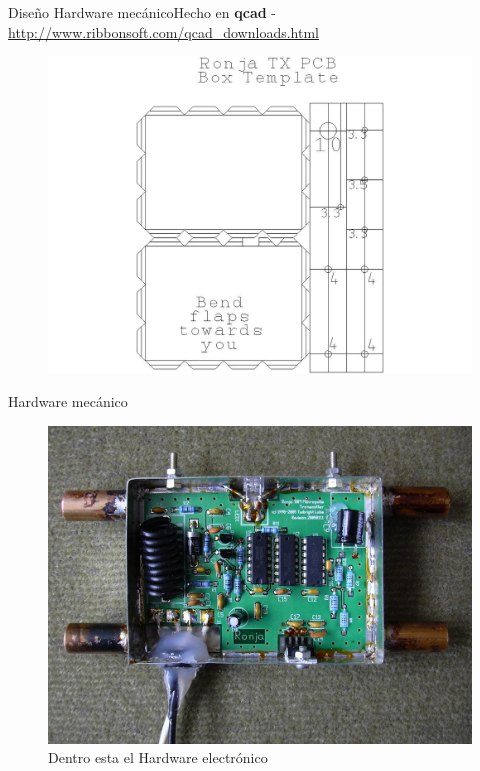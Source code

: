 \documentclass{beamer}
\begin{document}
\begin{frame}{Diseño Hardware mecánico}{Hecho en \textbf{qcad} - \url{http://www.ribbonsoft.com/qcad_downloads.html}}
  \begin{figure}
    \includegraphics[scale=0.225]{transmisor/tx_pcb2}
  \end{figure}
\end{frame}

\begin{frame}{Hardware mecánico}
  \begin{figure}
    \includegraphics[scale=0.85]{transmisor/1b76}
    \caption{Dentro esta el Hardware electrónico}
  \end{figure}
\end{frame}
\end{document}
